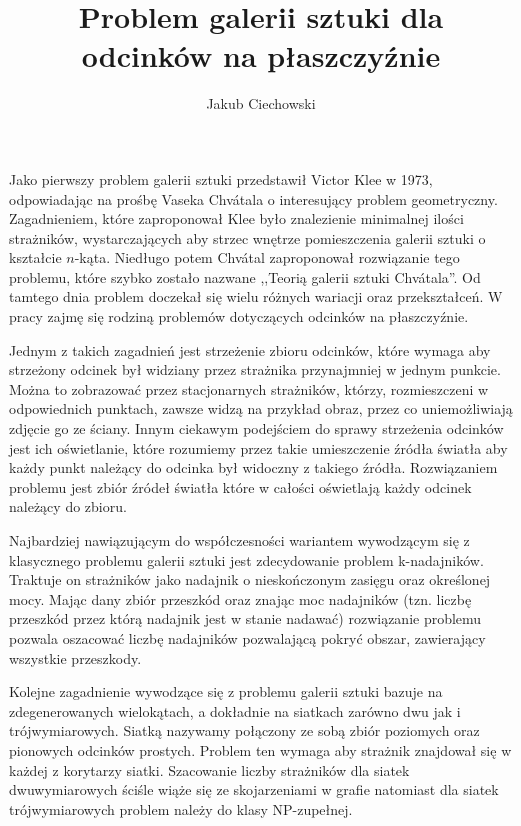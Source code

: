 \documentclass[brudnopis]{xmgr}
\author   {Jakub Ciechowski}
\title    {Problem galerii sztuki dla odcinków na płaszczyźnie}
\date     {\ymdtoday}
\theoremstyle{definition}
\begin{document}

\maketitle

\introduction
Jako pierwszy problem galerii sztuki przedstawił Victor Klee w 1973, odpowiadając na prośbę Vaseka Chv\'atala o interesujący problem geometryczny. Zagadnieniem, które zaproponował Klee było znalezienie minimalnej ilości strażników, wystarczających aby strzec wnętrze pomieszczenia galerii sztuki o kształcie $n$-kąta. Niedługo potem Chv\'atal zaproponował rozwiązanie tego problemu, które szybko zostało nazwane ,,Teorią galerii sztuki Chv\'atala''. Od tamtego dnia problem doczekał się wielu różnych wariacji oraz przekształceń. W pracy zajmę się rodziną problemów dotyczących odcinków na płaszczyźnie. 

Jednym z takich zagadnień jest strzeżenie zbioru odcinków, które wymaga aby strzeżony odcinek był widziany przez strażnika przynajmniej w jednym punkcie. Można to zobrazować przez stacjonarnych strażników, którzy, rozmieszczeni w odpowiednich punktach, zawsze widzą na przykład obraz, przez co uniemożliwiają zdjęcie go ze ściany. Innym ciekawym podejściem do sprawy strzeżenia odcinków jest ich oświetlanie, które  rozumiemy przez takie umieszczenie źródła światła aby każdy punkt należący do odcinka był widoczny z takiego źródła. Rozwiązaniem problemu jest zbiór źródeł światła które w całości oświetlają każdy odcinek należący do zbioru. 

Najbardziej nawiązującym do współczesności wariantem wywodzącym się z klasycznego problemu galerii sztuki jest zdecydowanie problem k-nadajników. Traktuje on strażników jako nadajnik o nieskończonym zasięgu oraz określonej mocy. Mając dany zbiór przeszkód oraz znając moc nadajników (tzn. liczbę przeszkód przez którą nadajnik jest w stanie nadawać) rozwiązanie problemu pozwala oszacować liczbę nadajników pozwalającą pokryć obszar, zawierający wszystkie przeszkody.

Kolejne zagadnienie wywodzące się z problemu galerii sztuki bazuje na zdegenerowanych wielokątach, a dokładnie na siatkach zarówno dwu jak i trójwymiarowych. Siatką nazywamy połączony ze sobą zbiór poziomych oraz pionowych odcinków prostych. Problem ten wymaga aby strażnik znajdował się w każdej z korytarzy siatki. Szacowanie liczby strażników dla siatek dwuwymiarowych ściśle wiąże się ze skojarzeniami w grafie natomiast dla siatek trójwymiarowych problem należy do klasy NP-zupełnej.
\end{document}

